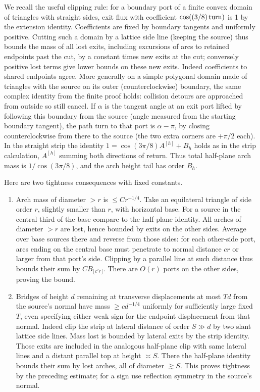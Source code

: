 \documentclass[11pt]{article}
\numberwithin{equation}{section}
\theoremstyle{definition}\newtheorem{definition}[theorem]{Definition}
\theoremstyle{remark}\newtheorem{remark}[theorem]{Remark}
\begin{document}
We recall the useful clipping rule: for a boundary port of a finite convex domain of triangles with straight sides, exit flux with coefficient \(\cos((3/8)\,{\rm turn})\) is 1 by the extension identity. Coefficients are fixed by boundary tangents and uniformly positive. Cutting such a domain by a lattice side line (keeping the source) thus bounds the mass of all lost exits, including excursions of arcs to retained endpoints past the cut, by a constant times new exits at the cut; conversely positive lost terms give lower bounds on these new exits. Indeed coefficients to shared endpoints agree. More generally on a simple polygonal domain made of triangles with the source on its outer (counterclockwise) boundary, the same complex identity from the finite proof holds: collision detours are approached from outside so still cancel. If \(\alpha\) is the tangent angle at an exit port lifted by following this boundary from the source (angle measured from the starting boundary tangent), the path turn to that port is \(\alpha-\pi\), by closing counterclockwise from there to the source (the two extra corners are \(+\pi/2\) each). In the straight strip the identity \(1=\cos(3\pi/8) A^{[h]}+B_h\) holds as in the strip calculation, \(A^{[h]}\) summing both directions of return. Thus total half-plane arch mass is \(1/\cos(3\pi/8)\), and the arch height tail has order \(B_h\).

Here are two tightness consequences with fixed constants.
\begin{enumerate}
\item Arch mass of diameter \(>r\) is \(\le C r^{-1/4}\). Take an equilateral triangle of side order \(r\), slightly smaller than \(r\), with horizontal base. For a source in the central third of the base compare to the half-plane identity. All arches of diameter \(>r\) are lost, hence bounded by exits on the other sides. Average over base sources there and reverse from those sides: for each other-side port, arcs ending on the central base must penetrate to normal distance \(c r\) or larger from that port's side. Clipping by a parallel line at such distance thus bounds their sum by \(C B_{\lfloor c'r\rfloor}\). There are \(O(r)\) ports on the other sides, proving the bound.
\item Bridges of height \(d\) remaining at transverse displacements at most \(Td\) from the source's normal have mass \(\ge c d^{-1/4}\) uniformly for sufficiently large fixed \(T\), even specifying either weak sign for the endpoint displacement from that normal. Indeed clip the strip at lateral distance of order \(S\gg d\) by two slant lattice side lines. Mass lost is bounded by lateral exits by the strip identity. Those exits are included in the analogous half-plane clip with same lateral lines and a distant parallel top at height \(\asymp S\). There the half-plane identity bounds their sum by lost arches, all of diameter \(\gtrsim S\). This proves tightness by the preceding estimate; for a sign use reflection symmetry in the source's normal.
\end{enumerate}
\end{document}
